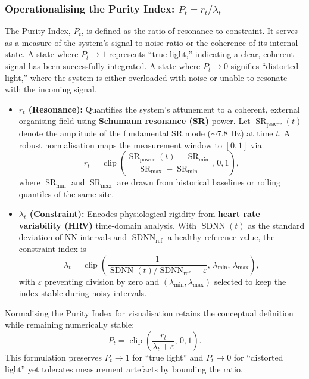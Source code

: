 \documentclass{article}
\begin{document}
\subsubsection{Operationalising the Purity Index: $P_t = r_t / \lambda_t$}

The Purity Index, $P_t$, is defined as the ratio of resonance to constraint. It serves as a measure of the system's signal-to-noise ratio or the coherence of its internal state. A state where $P_t \rightarrow 1$ represents ``true light,'' indicating a clear, coherent signal has been successfully integrated. A state where $P_t \rightarrow 0$ signifies ``distorted light,'' where the system is either overloaded with noise or unable to resonate with the incoming signal.

\begin{itemize}
    \item \textbf{$r_t$ (Resonance):} Quantifies the system's attunement to a coherent, external organising field using \textbf{Schumann resonance (SR)} power. Let $\operatorname{SR}_{\text{power}}(t)$ denote the amplitude of the fundamental SR mode ($\sim7.8$ Hz) at time $t$. A robust normalisation maps the measurement window to $[0,1]$ via
    \begin{equation}
        r_t = \operatorname{clip}\!\left(\frac{\operatorname{SR}_{\text{power}}(t) - \operatorname{SR}_{\min}}{\operatorname{SR}_{\max}-\operatorname{SR}_{\min}},\,0,1\right),
    \end{equation}
    where $\operatorname{SR}_{\min}$ and $\operatorname{SR}_{\max}$ are drawn from historical baselines or rolling quantiles of the same site.
    \item \textbf{$\lambda_t$ (Constraint):} Encodes physiological rigidity from \textbf{heart rate variability (HRV)} time-domain analysis. With $\operatorname{SDNN}(t)$ as the standard deviation of NN intervals and $\operatorname{SDNN}_{\text{ref}}$ a healthy reference value, the constraint index is
    \begin{equation}
        \lambda_t = \operatorname{clip}\!\left(\frac{1}{\operatorname{SDNN}(t)/\operatorname{SDNN}_{\text{ref}} + \varepsilon},\,\lambda_{\min},\,\lambda_{\max}\right),
    \end{equation}
    with $\varepsilon$ preventing division by zero and $(\lambda_{\min},\lambda_{\max})$ selected to keep the index stable during noisy intervals.
\end{itemize}

Normalising the Purity Index for visualisation retains the conceptual definition while remaining numerically stable:
\begin{equation}
    P_t = \operatorname{clip}\!\left(\frac{r_t}{\lambda_t + \varepsilon},\,0,1\right).
\end{equation}
This formulation preserves $P_t \rightarrow 1$ for ``true light'' and $P_t \rightarrow 0$ for ``distorted light'' yet tolerates measurement artefacts by bounding the ratio.
\end{document}

